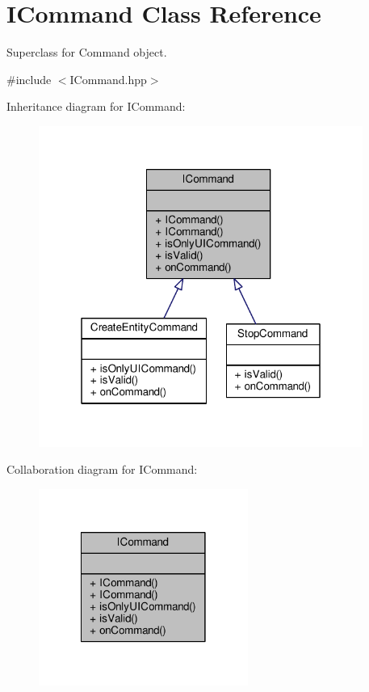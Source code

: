 \hypertarget{class_i_command}{\section{I\-Command Class Reference}
\label{class_i_command}
}


Superclass for Command object.  




{\ttfamily \#include $<$I\-Command.\-hpp$>$}



Inheritance diagram for I\-Command\-:
\nopagebreak
\begin{figure}[H]
\begin{center}
\leavevmode
\includegraphics[width=301pt]{class_i_command__inherit__graph}
\end{center}
\end{figure}


Collaboration diagram for I\-Command\-:
\nopagebreak
\begin{figure}[H]
\begin{center}
\leavevmode
\includegraphics[width=194pt]{class_i_command__coll__graph}
\end{center}
\end{figure}
